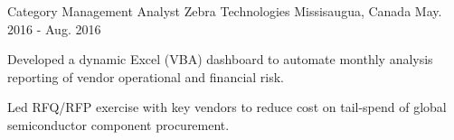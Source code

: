 \begin{cventries}
  \cventry
    {Category Management Analyst} %
    {Zebra Technologies} %
    {Missisaugua, Canada} %
    {May. 2016 - Aug. 2016} %
    {
      \begin{cvitems} %
        \item {Developed a dynamic Excel (VBA) dashboard to automate monthly analysis reporting of vendor operational and financial risk.}
        \item {Led RFQ/RFP exercise with key vendors to reduce cost on tail-spend of global semiconductor component procurement.}
      \end{cvitems}
    }

\end{cventries}
